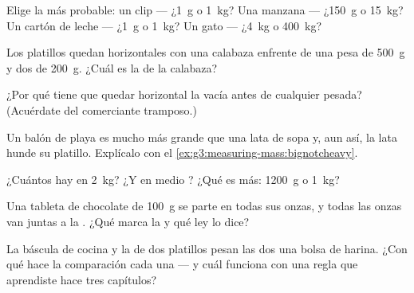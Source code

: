 \begin{exercise}[$\star$]\label{exo:g3:measuring-mass:2}
Elige la  más probable: un clip --- ¿\qty{1}{g} o \qty{1}{kg}?
Una manzana --- ¿\qty{150}{g} o \qty{15}{kg}? Un cartón de leche ---
¿\qty{1}{g} o \qty{1}{kg}? Un gato --- ¿\qty{4}{kg} o \qty{400}{kg}?
\end{exercise}

\begin{exercise}[$\star$]\label{exo:g3:measuring-mass:3}
Los platillos quedan horizontales con una calabaza enfrente de una
pesa de \qty{500}{g} y dos de \qty{200}{g}. ¿Cuál es la  de la
calabaza?
\end{exercise}

\begin{exercise}[$\star$]\label{exo:g3:measuring-mass:4}
¿Por qué tiene que quedar horizontal la  vacía antes de
cualquier pesada? (Acuérdate del comerciante tramposo.)
\end{exercise}

\begin{exercise}[$\star$]\label{exo:g3:measuring-mass:5}
Un balón de playa es mucho más grande que una lata de sopa y, aun así,
la lata hunde su platillo. Explícalo con el
\cref{ex:g3:measuring-mass:bignotcheavy}.
\end{exercise}

\begin{exercise}[$\star$]\label{exo:g3:measuring-mass:6}
¿Cuántos  hay en \qty{2}{kg}? ¿Y en medio ? ¿Qué es
más: \qty{1200}{g} o \qty{1}{kg}?
\end{exercise}

\begin{exercise}[$\star$]\label{exo:g3:measuring-mass:7}
Una tableta de chocolate de \qty{100}{g} se parte en todas sus
onzas, y todas las onzas van juntas a la . ¿Qué  marca la
 y qué ley lo dice?
\end{exercise}

\begin{exercise}[$\star$]\label{exo:g3:measuring-mass:8}
La báscula de cocina y la  de dos platillos pesan las dos una
bolsa de harina. ¿Con qué hace la comparación cada una --- y cuál
funciona con una regla que aprendiste hace tres capítulos?
\end{exercise}

